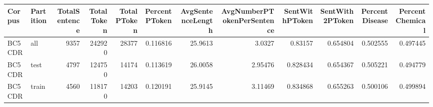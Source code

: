 \begin{tabular}{llrrrrrrrrrr}
\hline
 Corpus   & Partition   &   TotalSentence &   TotalToken &   TotalPToken &   PercentPToken &   AvgSentenceLength &   AvgNumberPTokenPerSentence &   SentWithPToken &   SentWith2PToken &   PercentDisease &   PercentChemical \\
\hline
 BC5CDR   & all         &            9357 &       242920 &         28377 &        0.116816 &             25.9613 &                      3.0327  &         0.83157  &          0.654804 &         0.502555 &          0.497445 \\
 BC5CDR   & test        &            4797 &       124750 &         14174 &        0.113619 &             26.0058 &                      2.95476 &         0.828434 &          0.654367 &         0.505221 &          0.494779 \\
 BC5CDR   & train       &            4560 &       118170 &         14203 &        0.120191 &             25.9145 &                      3.11469 &         0.834868 &          0.655263 &         0.500106 &          0.499894 \\
\hline
\end{tabular}
